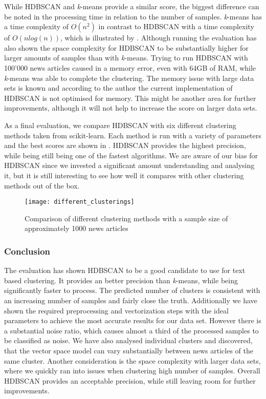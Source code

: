 While HDBSCAN and \textit{k}-means provide a similar score,
the biggest difference can be noted in the processing time in relation to the number of samples.
\textit{k}-means has a time complexity of $O(n^2)$ in contrast to HDBSCAN with a time complexity of $O(nlog(n))$,
which is illustrated by .
Although running the evaluation has also shown the space complexity for HDBSCAN
to be substantially higher for larger amounts of samples than with \textit{k}-means.
Trying to run HDBSCAN with 100'000 news articles caused in a memory error,
even with 64GB of RAM, while \textit{k}-means was able to complete the clustering.
The memory issue with large data sets is known and according to the author the current implementation of HDBSCAN
is not optimised for memory\cite{hdbscan_memory_issue}.
This might be another area for further improvements, although it will not help to increase the score on larger data sets.

As a final evaluation, we compare HDBSCAN with six different clustering methods taken from scikit-learn.
Each method is run with a variety of parameters and the best scores are shown in .
HDBSCAN provides the highest precision, while being still being one of the fastest algorithms.
We are aware of our bias for HDBSCAN since we invested a significant amount understanding and analysing it,
but it is still interesting to see how well it compares with other clustering methods out of the box.

\begin{figure}[h]
    \centering
    \texttt{[image: different\_clusterings]}
    \caption{Comparison of different clustering methods with a sample size of approximately 1000 news articles}
    \label{fig:different_clusterings}
\end{figure}

\subsubsection{Conclusion}
\label{subsubsec:5a_conclusion}

The evaluation has shown HDBSCAN to be a good candidate to use for text based clustering.
It provides an better precision than \textit{k}-means, while being significantly faster to process.
The predicted number of clusters is consistent with an increasing number of samples and fairly close the truth.
Additionally we have shown the required preprocessing and vectorization steps with the ideal parameters to achieve the most accurate results for our data set.
However there is a substantial noise ratio, which causes almost a third of the processed samples to be classified as noise.
We have also analysed individual clusters and discovered,
that the vector space model can vary substantially between news articles of the same cluster.
Another consideration is the space complexity with larger data sets,
where we quickly ran into issues when clustering high number of samples.
Overall HDBSCAN provides an acceptable precision, while still leaving room for further improvements.
